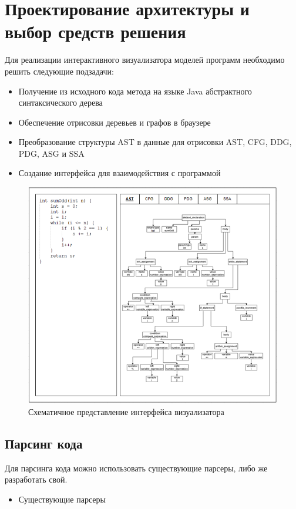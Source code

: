 \chapter{Проектирование архитектуры и выбор средств решения} \label{ch4}
Для реализации интерактивного визуализатора моделей программ необходимо решить следующие подзадачи:
\begin{itemize}
\item Получение из исходного кода метода на языке Java абстрактного синтаксического дерева
\item Обеспечение отрисовки деревьев и графов в браузере
\item Преобразование структуры AST в данные для отрисовки AST, CFG, DDG, PDG, ASG и SSA
\item Создание интерфейса для взаимодействия с программой
\end{itemize}
\begin{figure}[h]
	\center
	\includegraphics [scale=0.75] {my_folder/images/my/12}
	\caption{Схематичное представление интерфейса визуализатора} 
	\label{fig:12}  
\end{figure}
\section{Парсинг кода} \label{ch4:sec1}
Для парсинга кода можно использовать существующие парсеры, либо же разработать свой.
\begin{itemize}
\item Существующие парсеры
\end{itemize}

